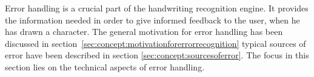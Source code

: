   


    

    
    

%    
%    


Error handling is a crucial part of the handwriting recognition engine.
It provides the information needed in order to give informed feedback to 
the user, when he has drawn a character. The general motivation for error 
handling has been discussed in 
section~\ref{sec:concept:motivationforerrorrecognition}
typical sources of error have been described in 
section \ref{sec:concept:sourcesoferror}. 
The focus in this section lies on the technical aspects of error handling.

